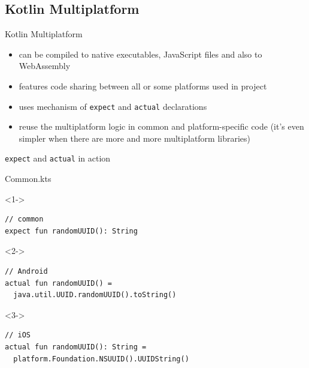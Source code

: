 \documentclass[hyperref={pdfpagelabels=false},xcolor={dvipsnames},compress]{beamer}
\begin{document}
    \subsection{Kotlin Multiplatform}

    \begin{frame}{Kotlin Multiplatform}
        \begin{itemize}
            \item can be compiled to native executables, JavaScript files and also to WebAssembly \pause
            \item features code sharing between all or some platforms used in project \pause
            \item uses mechanism of \texttt{expect} and \texttt{actual} declarations \pause
            \item reuse the multiplatform logic in common and platform-specific code (it's even
            simpler when there are more and more multiplatform libraries)
        \end{itemize}
    \end{frame}

    \begin{frame}[fragile]{\texttt{expect} and \texttt{actual} in action}
        \begin{exampleblock}{Common.kts}
            \begin{onlyenv}<1->
                \begin{lstlisting}
// common
expect fun randomUUID(): String
                \end{lstlisting}
            \end{onlyenv}
            \begin{onlyenv}<2->
                \begin{lstlisting}
// Android
actual fun randomUUID() = 
  java.util.UUID.randomUUID().toString()
                \end{lstlisting}
            \end{onlyenv}
            \begin{onlyenv}<3->
                \begin{lstlisting}
// iOS
actual fun randomUUID(): String = 
  platform.Foundation.NSUUID().UUIDString()
                \end{lstlisting}
            \end{onlyenv}
        \end{exampleblock}
    \end{frame}
\end{document}

